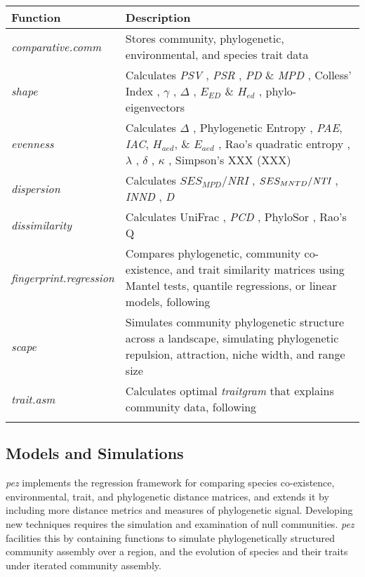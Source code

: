 \documentclass{bioinfo}
\begin{document}
\begin{table*}
  {\begin{tabular}{p{2.5cm} p{15cm}}\toprule
      Function & Description\\\midrule
      \emph{comparative.comm} & Stores community, phylogenetic, environmental, and species trait data\\
      \emph{shape} & Calculates \emph{PSV} \citep{Helmus2007}, \emph{PSR} \citep{Helmus2007}, \emph{PD} \& \emph{MPD} \citep{Faith1992}, Colless' Index \citep{Colless1982}, $\gamma$ \citep{Pybus2000}, $\Delta$ \citep{Warwick1995}, $E_{ED}$ \& $H_{ed}$ \citep{Cadotte2010}, phylo-eigenvectors \citep{Diniz-Filho2011}\\
      \emph{evenness} & Calculates $\Delta$ \citep{Warwick1995}, Phylogenetic Entropy \citep{Allen2009}, \emph{PAE}, \emph{IAC}, $H_{aed}$, \& $E_{aed}$ \citep{Cadotte2010}, Rao's quadratic entropy \citep{Rao1982a}, $\lambda$ \citep{Pagel1999}, $\delta$ \citep{Pagel1999}, $\kappa$ \citep{Pagel1999}, Simpson's XXX (XXX)\\
      \emph{dispersion} & Calculates $SES_{MPD}$/\emph{NRI} \citep{Webb2000,Webb2002,Kembel2009}, $SES_{MNTD}/\emph{NTI}$ \citep{Webb2000,Webb2002,Kembel2009}, \emph{INND} \citep{Ness2011}, \emph{D} \citep{Fritz2010}\\
      \emph{dissimilarity} &  Calculates UniFrac \citep{Lozupone2005}, \emph{PCD} \citep{Helmus2010}, PhyloSor \citep{Bryant2008}, Rao's Q \citep{Rao1982a}\\
      \emph{fingerprint.regression} & Compares phylogenetic, community co-existence, and trait similarity matrices using Mantel tests, quantile regressions, or linear models, following \citep{Cavender-Bares2004,Cavender-Bares2006} \\
      \emph{scape} & Simulates community phylogenetic structure across a landscape, simulating phylogenetic repulsion, attraction, niche width, and range size \citep{Helmus2012}\\
      \emph{trait.asm} & Calculates optimal \emph{traitgram} that explains community data, following \citep{Cadotte2013}\\
      \botrule
\end{tabular}}{}
\end{table*}
\subsection{Models and Simulations}
\emph{pez} implements the \citet{Cavender-Bares2004} regression
framework for comparing species co-existence, environmental, trait,
and phylogenetic distance matrices, and extends it by including more
distance metrics and measures of phylogenetic signal. Developing new
techniques requires the simulation and examination of null
communities. \emph{pez} facilities this by containing functions to
simulate phylogenetically structured community assembly over a region,
and the evolution of species and their traits under iterated community
assembly.
\end{document}
